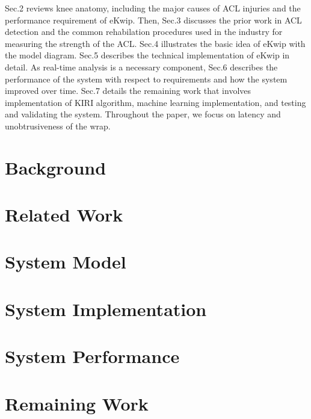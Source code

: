 \documentclass{sig-alternate}
\begin{document}
Sec.2 reviews knee anatomy, including the major causes of ACL injuries and the performance requirement of eKwip. Then, Sec.3 discusses the prior work in ACL detection and the common rehabilation procedures used in the industry for measuring the strength of the ACL. Sec.4 illustrates the basic idea of eKwip with the model diagram. Sec.5 describes the technical implementation of eKwip in detail. As real-time analysis is a necessary component, Sec.6 describes the performance of the system with respect to requirements and how the system improved over time. Sec.7 details the remaining work that involves implementation of KIRI algorithm, machine learning implementation, and testing and validating the system. Throughout the paper, we focus on latency and unobtrusiveness of the wrap.

\section{Background}
\label{sec:background}


\section{Related Work}
\label{sec:related_work}


\section{System Model}
\label{sec:system_model}


\section{System Implementation}
\label{sec:system_implementation}


\section{System Performance}
\label{sec:system_performance}


\section{Remaining Work}
\label{sec:remaining_work}


\end{document}
